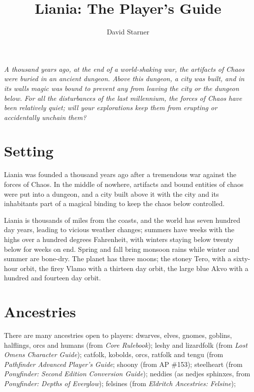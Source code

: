 \documentclass{report}
\title{Liania: The Player's Guide}
\author{David Starner}
\begin{document}
\maketitle
\emph{A thousand years ago, at the end of a world-shaking war, the artifacts of
Chaos were buried in an ancient dungeon. Above this dungeon, a city was built,
and in its walls magic was bound to prevent any from leaving the city or the
dungeon below. For all the disturbances of the last millennium, the forces
of Chaos have been relatively quiet; will your explorations keep them from
erupting or accidentally unchain them?}

\chapter{Setting}

Liania was founded a thousand years ago after a tremendous war against the forces of Chaos. In the middle of
nowhere, artifacts and bound entities of chaos were put into a dungeon, and a city built above it with the city
and its inhabitants part of a magical binding to keep the chaos below controlled.

Liania is thousands of miles from the coasts, and the world has seven hundred day years, leading to vicious
weather changes; summers have weeks with the highs over a hundred degrees Fahrenheit, with winters staying
below twenty below for weeks on end. Spring and fall bring monsoon rains while winter and summer are bone-dry.
The planet has three moons; the stoney Tero, with a sixty-hour orbit, the firey Vlamo with a thirteen day orbit,
the large blue Akvo with a hundred and fourteen day orbit.


\chapter{Ancestries}

There are many ancestries open to players: dwarves, elves, gnomes, goblins,
halflings, orcs and humans (from \emph{Core Rulebook}); leshy and lizard\-folk (from
\emph{Lost Omens Character Guide}); catfolk, kobolds, orcs, ratfolk and tengu (from
\emph{Pathfinder Advanced Player's Guide}; shoony (from AP \#153);
steel\-heart (from \emph{Pony\-finder: Second Edition Con\-version Guide}); neddies (as nedjes sphinxes, from \emph{Pony\-finder:
Depths of Everglow}); felsines (from \emph{Eldritch Ancestries: Felsine});
\end{document}
